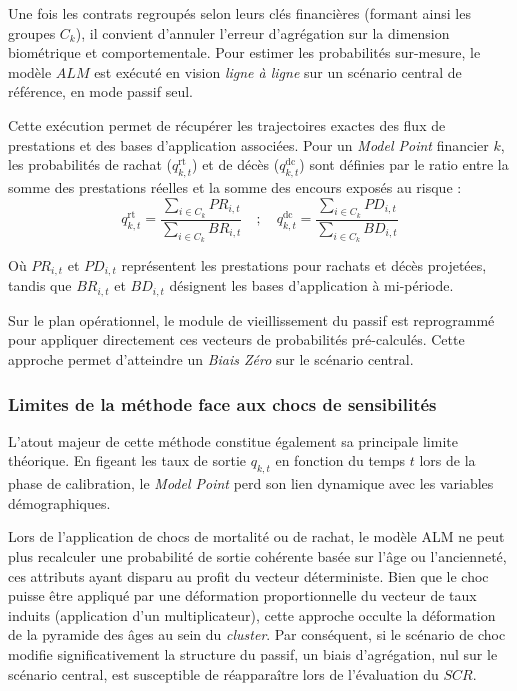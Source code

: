 Une fois les contrats regroupés selon leurs clés financières (formant ainsi les groupes $C_k$), il convient d'annuler l'erreur d'agrégation sur la dimension biométrique et comportementale. Pour estimer les probabilités sur-mesure, le modèle $ALM$ est exécuté en vision \textit{ligne à ligne} sur un scénario central de référence, en mode passif seul.

Cette exécution permet de récupérer les trajectoires exactes des flux de prestations et des bases d'application associées. Pour un \textit{Model Point} financier $k$, les probabilités de rachat ($q_{k,t}^{\text{rt}}$) et de décès ($q_{k,t}^{\text{dc}}$) sont définies par le ratio entre la somme des prestations réelles et la somme des encours exposés au risque :
\begin{equation}
    q_{k,t}^{\text{rt}} = \frac{\sum_{i \in C_k} PR_{i,t}}{\sum_{i \in C_k} BR_{i,t}} \quad ; \quad q_{k,t}^{\text{dc}} = \frac{\sum_{i \in C_k} PD_{i,t}}{\sum_{i \in C_k} BD_{i,t}}
\end{equation}

Où $PR_{i,t}$ et $PD_{i,t}$ représentent les prestations pour rachats et décès projetées, tandis que $BR_{i,t}$ et $BD_{i,t}$ désignent les bases d'application à mi-période.

Sur le plan opérationnel, le module de vieillissement du passif est reprogrammé pour appliquer directement ces vecteurs de probabilités pré-calculés. Cette approche permet d'atteindre un \textit{Biais Zéro} sur le scénario central.

\subsubsection{Limites de la méthode face aux chocs de sensibilités}

L'atout majeur de cette méthode constitue également sa principale limite théorique. En figeant les taux de sortie $q_{k,t}$ en fonction du temps $t$ lors de la phase de calibration, le \textit{Model Point} perd son lien dynamique avec les variables démographiques. 

Lors de l'application de chocs de mortalité ou de rachat, le modèle ALM ne peut plus recalculer une probabilité de sortie cohérente basée sur l'âge ou l'ancienneté, ces attributs ayant disparu au profit du vecteur déterministe. Bien que le choc puisse être appliqué par une déformation proportionnelle du vecteur de taux induits (application d'un multiplicateur), cette approche occulte la déformation de la pyramide des âges au sein du \textit{cluster}. Par conséquent, si le scénario de choc modifie significativement la structure du passif, un biais d'agrégation, nul sur le scénario central, est susceptible de réapparaître lors de l'évaluation du $SCR$.

